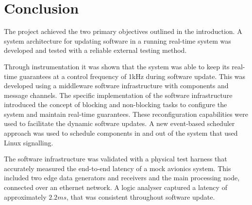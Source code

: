 \chapter{Conclusion}



The project achieved the two primary objectives outlined in the introduction. A system architecture for updating software in a running real-time system was developed and tested with a reliable external testing method.

Through instrumentation it was shown that the system was able to keep its real-time guarantees at a control frequency of 1kHz during software update. This was developed using a middleware software infrastructure with components and message channels. The specific implementation of the software infrastructure introduced the concept of blocking and non-blocking tasks to configure the system and maintain real-time guarantees. These reconfiguration capabilities were used to facilitate the dynamic software updates. A new event-based scheduler approach was used to schedule components in and out of the system that used Linux signalling.

The software infrastructure was validated with a physical test harness that accurately measured the end-to-end latency of a mock avionics system. This included two edge data generators and receivers and the main processing node, connected over an ethernet network. A logic analyser captured a latency of approximately $2.2ms$, that was consistent throughout software update.

